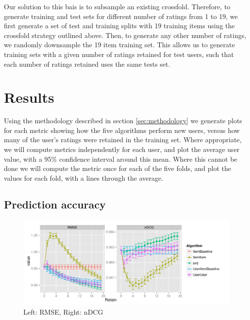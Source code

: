 \documentclass[letterpaper]{sig-alternate}
\begin{document}
  Our solution to this bais is to subsample an existing crossfold.
  Therefore, to generate training and test sets for different number of ratings from 1 to 19, we first generate a set of test and training splits with 19 training items using the crossfold strategy outlined above.
  Then, to generate any other number of ratings, we randomly downsample the 19 item training set.
  This allows us to generate training sets with a given number of ratings retained for test users, such that each number of ratings retained uses the same tests set.

\section{Results}

  Using the methodology described in section \ref{sec:methodology} we generate plots for each metric showing how the five algorithms perform new users, versus how many of the user's ratings were retained in the training set.
  Where appropriate, we will compute metrics independently for each user, and plot the average user value, with a 95\% confidence interval around this mean.
  Where this cannot be done we will compute the metric once for each of the five folds, and plot the values for each fold, with a lines through the average.

\subsection{Prediction accuracy}
\begin{figure}[ht!]
  \centering
  \includegraphics[width=0.9\linewidth]{../lenskit/output/ekstrandTuned20/accuracy.pdf}
  \caption{Left: RMSE, Right: nDCG}
  \label{fig:rmse}
  \label{fig:ndcg}
\end{figure}
\end{document}
